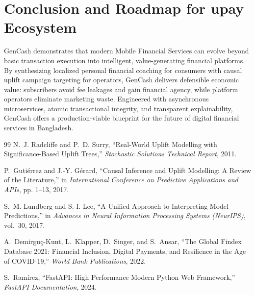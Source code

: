 \documentclass[10.5pt,a4paper]{article}
\begin{document}
\section{Conclusion and Roadmap for upay Ecosystem}

GenCash demonstrates that modern Mobile Financial Services can evolve beyond basic transaction execution into intelligent, value-generating financial platforms. By synthesizing localized personal financial coaching for consumers with causal uplift campaign targeting for operators, GenCash delivers defensible economic value: subscribers avoid fee leakages and gain financial agency, while platform operators eliminate marketing waste. Engineered with asynchronous microservices, atomic transactional integrity, and transparent explainability, GenCash offers a production-viable blueprint for the future of digital financial services in Bangladesh.

\begin{thebibliography}{99}
N.~J. Radcliffe and P.~D. Surry, ``Real-World Uplift Modelling with Significance-Based Uplift Trees,'' \emph{Stochastic Solutions Technical Report}, 2011.

P.~Guti{\'e}rrez and J.-Y. G{\'e}rard, ``Causal Inference and Uplift Modelling: A Review of the Literature,'' in \emph{International Conference on Predictive Applications and APIs}, pp. 1--13, 2017.

S.~M. Lundberg and S.-I. Lee, ``A Unified Approach to Interpreting Model Predictions,'' in \emph{Advances in Neural Information Processing Systems (NeurIPS)}, vol.~30, 2017.

A.~Demirgu{\c{c}}-Kunt, L.~Klapper, D.~Singer, and S.~Ansar, ``The Global Findex Database 2021: Financial Inclusion, Digital Payments, and Resilience in the Age of COVID-19,'' \emph{World Bank Publications}, 2022.

S.~Ram{\'i}rez, ``FastAPI: High Performance Modern Python Web Framework,'' \emph{FastAPI Documentation}, 2024.
\end{thebibliography}
\end{document}
